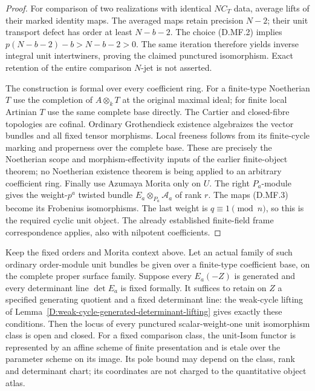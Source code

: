 \begin{proof}
For comparison of two realizations with identical $NC_T$
data, average lifts of their marked identity maps.
The averaged maps retain precision $N-2$; their unit
transport defect has order at least $N-b-2$.
The choice (D.MF.2) implies
$p(N-b-2)-b>N-b-2>0$.
The same iteration therefore yields inverse integral
unit intertwiners, proving the claimed punctured
isomorphism. Exact retention of the entire comparison
$N$-jet is not asserted.

The construction is formal over every coefficient ring.
For a finite-type Noetherian $T$ use the completion of
$A\otimes_kT$ at the original maximal ideal; for finite
local Artinian $T$ use the same complete base directly.
The Cartier and closed-fibre topologies are cofinal.
Ordinary Grothendieck existence algebraizes the vector
bundles and all fixed tensor morphisms. Local freeness
follows from its finite-cycle marking and properness over
the complete base. These are precisely the Noetherian
scope and morphism-effectivity inputs of the earlier
finite-object theorem; no Noetherian existence theorem
is being applied to an arbitrary coefficient ring.
Finally use Azumaya Morita only on $U$. The right
$P_a$-module gives the weight-$p^a$ twisted bundle
$E_a\otimes_{P_a}\mathcal A_a$ of rank $r$.
The maps (D.MF.3) become its Frobenius isomorphisms.
The last weight is $q\equiv1\pmod n$, so this is the
required cyclic unit object. The already established
finite-field frame correspondence applies, also with
nilpotent coefficients.
\end{proof}

\begin{proposition}
\label{D:generated-Morita-unit-Isom-openness}
Keep the fixed orders and Morita context above. Let an
actual family of such ordinary order-module unit bundles
be given over a finite-type coefficient base, on the
complete proper surface family. Suppose every $E_a(-Z)$
is generated and every determinant line $\det E_a$ is
fixed formally. It suffices to retain on $Z$ a specified
generating quotient and a fixed determinant line: the
weak-cycle lifting of
Lemma~\ref{D:weak-cycle-generated-determinant-lifting}
gives exactly these conditions.
Then the locus of every punctured scalar-weight-one
unit isomorphism class is open and closed. For a fixed
comparison class, the unit-Isom functor is represented
by an affine scheme of finite presentation and is etale
over the parameter scheme on its image. Its pole bound
may depend on the class, rank and determinant chart;
its coordinates are not charged to the quantitative
object atlas.
\end{proposition}

